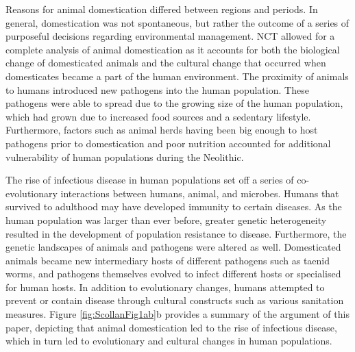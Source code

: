 Reasons for animal domestication differed between regions and periods. In general, domestication was not spontaneous, but rather the outcome of a series of purposeful decisions regarding environmental management. 
NCT allowed for a complete analysis of animal domestication as it accounts for both the biological change of domesticated animals and the cultural change that occurred when domesticates became a part of the human environment. 
The proximity of animals to humans introduced new pathogens into the human population. These pathogens were able to spread due to the growing size of the human population, which had grown due to increased food sources and a sedentary lifestyle. Furthermore, factors such as animal herds having been big enough to host pathogens prior to domestication and poor nutrition accounted for additional vulnerability of human populations during the Neolithic.

The rise of infectious disease in human populations set off a series of co-evolutionary interactions between humans, animal, and microbes. Humans that survived to adulthood may have developed immunity to certain diseases. As the human population was larger than ever before, greater genetic heterogeneity resulted in the development of population resistance to disease. Furthermore, the genetic landscapes of animals and pathogens were altered as well. Domesticated animals became new intermediary hosts of different pathogens such as taenid worms, and pathogens themselves evolved to infect different hosts or specialised for human hosts. In addition to evolutionary changes, humans attempted to prevent or contain disease through cultural constructs such as various sanitation measures. 
Figure \ref{fig:ScollanFig1ab}b provides a summary of the argument of this paper, 
depicting that animal domestication led to the rise of infectious disease, which in turn led to evolutionary and cultural changes in human populations.


